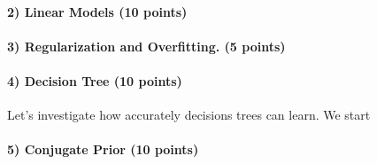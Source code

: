 \documentclass[11pt]{article}
\begin{document}
\paragraph{2) Linear Models (10 points)}


\paragraph{3) Regularization and Overfitting. (5 points)}


\paragraph{4) Decision Tree (10 points)} Let's investigate how accurately decisions trees can learn. We start 


\paragraph{5) Conjugate Prior (10 points)}
\end{document}
